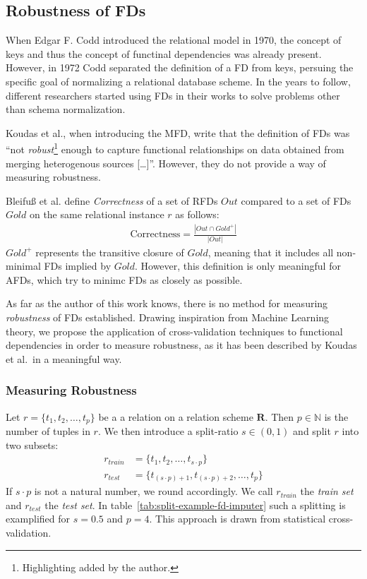 \subsection{Robustness of FDs}
When Edgar F. Codd introduced the relational model in 1970, the concept of keys and thus the concept of functinal dependencies was already present.\cite[p.~70]{MAI83}
However, in 1972 Codd separated the definition of a FD from keys, persuing the specific goal of normalizing a relational database scheme.
In the years to follow, different researchers started using FDs in their works to solve problems other than schema normalization.

Koudas et al., when introducing the MFD, write that the definition of FDs was ``not \emph{robust}\footnote{Highlighting added by the author.} enough to capture functional relationships on data obtained from merging heterogenous sources [\dots]''.\cite[p.~1]{KOU09}
However, they do not provide a way of measuring robustness.

Bleifuß et al.\cite[p.~3]{BLE16} define \emph{Correctness} of a set of RFDs \( Out \) compared to a set of FDs \( Gold \) on the same relational instance \( r \) as follows:
\begin{align*}
    \text{Correctness} = \frac{|Out \cap Gold^{+}|}{|Out|}
\end{align*}
\( Gold^{+} \) represents the transitive closure of \( Gold \), meaning that it includes all non-minimal FDs implied by \( Gold \).
However, this definition is only meaningful for AFDs, which try to minimc FDs as closely as possible.

As far as the author of this work knows, there is no method for measuring \emph{robustness} of FDs established.
Drawing inspiration from Machine Learning theory, we propose the application of cross-validation techniques to functional dependencies in order to measure robustness, as it has been described by Koudas et al.\, in a meaningful way.

\subsubsection{Measuring Robustness}
Let \( r = \{ t_1, t_2, \dots, t_p \}\) be a a relation on a relation scheme \( \boldsymbol{R} \).
Then \( p \in \mathbb{N} \) is the number of tuples in \( r \).
We then introduce a split-ratio \( s \in (0, 1) \) and split \( r \) into two subsets:
\begin{align*}
    r_{train} &= \{ t_1, t_2, \dots, t_{s \cdot p} \} \\
    r_{test} &= \{ t_{(s \cdot p) + 1}, t_{(s \cdot p) + 2}, \dots, t_{p} \}
\end{align*}
If \( s \cdot p \) is not a natural number, we round accordingly.
We call \( r_{train} \) the \emph{train set} and \( r_{test} \) the \emph{test set}.
In table~\ref{tab:split-example-fd-imputer} such a splitting is examplified for \( s = 0.5 \) and \( p=4 \).
This approach is drawn from statistical cross-validation.

